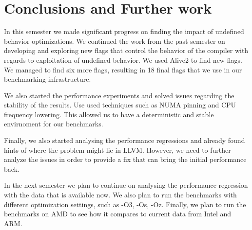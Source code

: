 \section{Conclusions and Further work}

In this semester we made significant progress on finding the impact of undefined
behavior optimizations. We continued the work from the past semester on
developing and exploring new flags that control the behavior of the compiler
with regards to exploitation of undefined behavior. We used Alive2 to find new
flags. We managed to find six more flags, resulting in 18 final flags that we
use in our benchmarking infrastructure.

We also started the performance experiments and solved issues regarding the
stability of the results. Use used techniques such as NUMA pinning and CPU
frequency lowering. This allowed us to have a deterministic and stable
envirnoment for our benchmarks.

Finally, we also started analysing the performance regressions and already found
hints of where the problem might lie in LLVM. However, we need to further analyze
the issues in order to provide a fix that can bring the initial performance
back.

In the next semester we plan to continue on analysing the performance regression
with the data that is available now. We also plan to run the benchmarks with
different optimization settings, such as -O3, -Os, -Oz. Finally, we plan to run
the benchmarks on AMD to see how it compares to current data from Intel and ARM.
